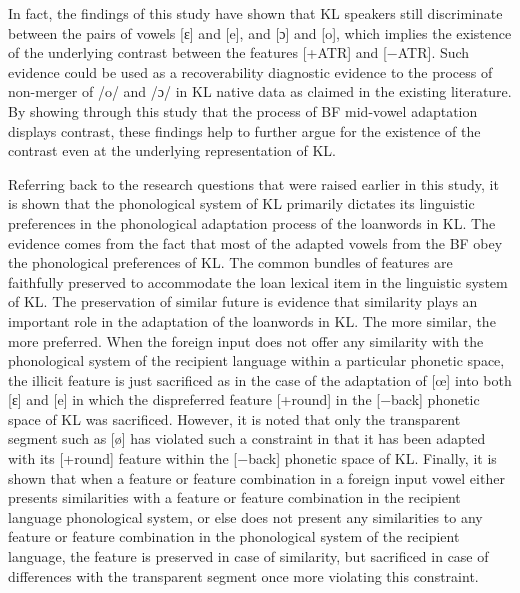 \documentclass[output=paper]{langscibook}
\begin{document}
In fact, the findings of this study have shown that KL speakers still discriminate between the pairs of vowels [ɛ] and [e], and [ɔ] and [o], which implies the existence of the underlying contrast between the features [+ATR] and [−ATR]. Such evidence could be used as a recoverability diagnostic evidence to the process of non-merger of /o/ and /ɔ/ in KL native data as claimed in the existing literature. By showing through this study that the process of BF mid-vowel adaptation displays contrast, these findings help to further argue for the existence of the contrast even at the underlying representation of KL.

Referring back to the research questions that were raised earlier in this study, it is shown that the phonological system of KL primarily dictates its linguistic preferences in the phonological adaptation process of the loanwords in KL. The evidence comes from the fact that most of the adapted vowels from the BF obey the phonological preferences of KL. The common bundles of features are faithfully preserved to accommodate the loan lexical item in the linguistic system of KL. The preservation of similar future is evidence that similarity plays an important role in the adaptation of the loanwords in KL. The more similar, the more preferred. When the foreign input does not offer any similarity with the phonological system of the recipient language within a particular phonetic space, the illicit feature is just sacrificed as in the case of the adaptation of [œ] into both [ɛ] and [e] in which the dispreferred feature [+round] in the [−back] phonetic space of KL was sacrificed. However, it is noted that only the transparent segment such as [ø] has violated such a constraint in that it has been adapted with its [+round] feature within the [−back] phonetic space of KL. Finally, it is shown that when a feature or feature combination in a foreign input vowel either presents similarities with a feature or feature combination in the recipient  language phonological system, or else does not present any similarities to any feature or feature combination in the phonological system of the recipient language, the feature is preserved in case of similarity, but sacrificed in case of differences with the transparent segment once more violating this constraint.

\printbibliography[heading=subbibliography,notkeyword=this]
\end{document}
